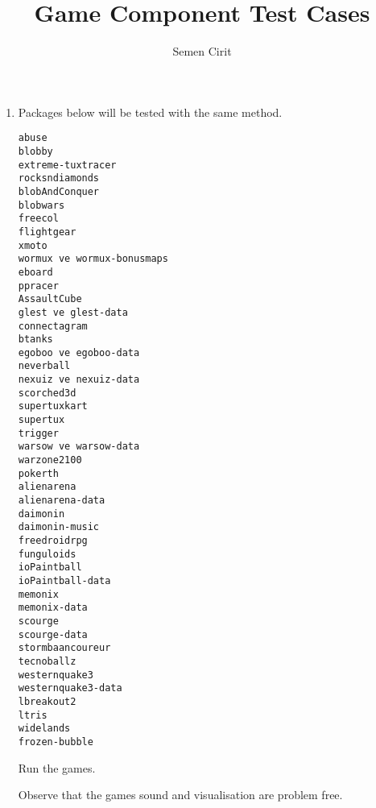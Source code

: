 \documentclass[a4paper,10pt]{article}
\title{Game Component Test Cases }
\author{Semen Cirit}
\begin{document}
\maketitle

\begin{enumerate}
\item Packages below will be tested with the same method.
\begin{verbatim}
abuse
blobby
extreme-tuxtracer
rocksndiamonds 
blobAndConquer
blobwars
freecol
flightgear
xmoto
wormux ve wormux-bonusmaps
eboard
ppracer
AssaultCube
glest ve glest-data
connectagram
btanks
egoboo ve egoboo-data
neverball
nexuiz ve nexuiz-data
scorched3d
supertuxkart
supertux
trigger
warsow ve warsow-data
warzone2100
pokerth
alienarena
alienarena-data
daimonin
daimonin-music
freedroidrpg
funguloids
ioPaintball
ioPaintball-data
memonix
memonix-data
scourge
scourge-data
stormbaancoureur
tecnoballz
westernquake3
westernquake3-data
lbreakout2
ltris
widelands
frozen-bubble
\end{verbatim}

Run the games.

Observe that the games sound and visualisation are problem free.
\end{enumerate}
\end{document}
